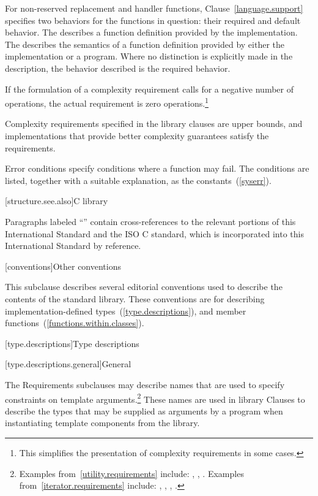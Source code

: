\pnum
For non-reserved replacement and handler functions,
Clause~\ref{language.support} specifies two behaviors for the functions in question:
their required and default behavior.
The
describes a function definition provided by the implementation.
%
The
describes the semantics of a function definition provided by
%
either the implementation or a \Cpp program.
Where no distinction is explicitly made in the description, the
behavior described is the required behavior.

\pnum
If the formulation of a complexity requirement calls for a negative number of
operations, the actual requirement is zero operations.\footnote{This simplifies
the presentation of complexity requirements in some cases.}

\pnum
Complexity requirements specified in the library clauses are upper bounds,
and implementations that provide better complexity guarantees satisfy
the requirements.

\pnum
Error conditions specify conditions where a function may fail. The conditions
are listed, together with a suitable explanation, as the 
constants~(\ref{syserr}).

[structure.see.also]{C library}

\pnum
Paragraphs labeled ``\xref'' contain cross-references to the relevant portions
of this International Standard and the ISO C standard,
which is incorporated into this International Standard by reference.

[conventions]{Other conventions}
%

\pnum
This subclause describes several editorial conventions used to describe the contents
of the \Cpp standard library.
These conventions are for describing
implementation-defined types~(\ref{type.descriptions}),
and member functions~(\ref{functions.within.classes}).

[type.descriptions]{Type descriptions}

[type.descriptions.general]{General}

\pnum
The Requirements subclauses may describe names that are used to specify
constraints on template arguments.\footnote{Examples
from~\ref{utility.requirements} include:
,
,
.
Examples from~\ref{iterator.requirements} include:
,
,
,
.}
These names are used in library Clauses
to describe the types that
may be supplied as arguments by a \Cpp program when instantiating template components from
the library.

